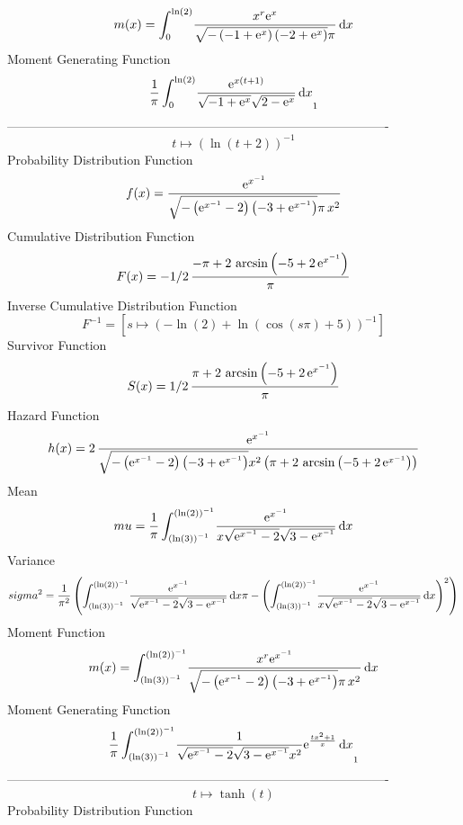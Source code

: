 \documentclass[12pt]{article}
\begin{document}
 $$ m(x) = \int_{0}^{\ln  \left( 2 \right) }\!{\frac {{x}^{r}{{\rm e}^{x}}}{
\sqrt {- \left( -1+{{\rm e}^{x}} \right)  \left( -2+{{\rm e}^{x}}
 \right) }\pi}}\,{\rm d}x
$$ Moment Generating Function 
 $${\frac {1}{\pi}\int_{0}^{\ln  \left( 2 \right) }\!{\frac {{{\rm e}^{x
 \left( t+1 \right) }}}{\sqrt {-1+{{\rm e}^{x}}}\sqrt {2-{{\rm e}^{x}}
}}}\,{\rm d}x}_{{1}}
$$-------------------------------------------------------------------------------------------  \\$$t\mapsto  \left( \ln  \left( t+2 \right)  \right) ^{-1}
$$Probability Distribution Function 
$$  f(x)={\frac {{{\rm e}^{{x}^{-1}}}}{\sqrt {- \left( {{\rm e}^{{x}^{-1}}}-2
 \right)  \left( -3+{{\rm e}^{{x}^{-1}}} \right) }\pi\,{x}^{2}}}
$$Cumulative Distribution Function  
 $$F(x)=-1/2\,{\frac {-\pi+2\,\arcsin \left( -5+2\,{{\rm e}^{{x}^{-1}}}
 \right) }{\pi}}
$$ Inverse Cumulative Distribution Function 
  $$F^{-1} = [s\mapsto  \left( -\ln  \left( 2 \right) +\ln  \left( \cos \left( s\pi
 \right) +5 \right)  \right) ^{-1}]
$$Survivor Function 
 $$ S(x)=1/2\,{\frac {\pi+2\,\arcsin \left( -5+2\,{{\rm e}^{{x}^{-1}}} \right) 
}{\pi}}
$$ Hazard Function 
 $$ h(x)=2\,{\frac {{{\rm e}^{{x}^{-1}}}}{\sqrt {- \left( {{\rm e}^{{x}^{-1}}}-
2 \right)  \left( -3+{{\rm e}^{{x}^{-1}}} \right) }{x}^{2} \left( \pi+
2\,\arcsin \left( -5+2\,{{\rm e}^{{x}^{-1}}} \right)  \right) }}
$$ Mean 
 $$ mu={\frac {1}{\pi}\int_{ \left( \ln  \left( 3 \right)  \right) ^{-1}}^{
 \left( \ln  \left( 2 \right)  \right) ^{-1}}\!{\frac {{{\rm e}^{{x}^{
-1}}}}{x\sqrt {{{\rm e}^{{x}^{-1}}}-2}\sqrt {3-{{\rm e}^{{x}^{-1}}}}}}
\,{\rm d}x}
$$ Variance 
 $$ sigma^2 = {\frac {1}{{\pi}^{2}} \left( \int_{ \left( \ln  \left( 3 \right) 
 \right) ^{-1}}^{ \left( \ln  \left( 2 \right)  \right) ^{-1}}\!{
\frac {{{\rm e}^{{x}^{-1}}}}{\sqrt {{{\rm e}^{{x}^{-1}}}-2}\sqrt {3-{
{\rm e}^{{x}^{-1}}}}}}\,{\rm d}x\pi- \left( \int_{ \left( \ln  \left( 
3 \right)  \right) ^{-1}}^{ \left( \ln  \left( 2 \right)  \right) ^{-1
}}\!{\frac {{{\rm e}^{{x}^{-1}}}}{x\sqrt {{{\rm e}^{{x}^{-1}}}-2}
\sqrt {3-{{\rm e}^{{x}^{-1}}}}}}\,{\rm d}x \right) ^{2} \right) }
$$ Moment Function 
 $$ m(x) = \int_{ \left( \ln  \left( 3 \right)  \right) ^{-1}}^{ \left( \ln 
 \left( 2 \right)  \right) ^{-1}}\!{\frac {{x}^{r}{{\rm e}^{{x}^{-1}}}
}{\sqrt {- \left( {{\rm e}^{{x}^{-1}}}-2 \right)  \left( -3+{{\rm e}^{
{x}^{-1}}} \right) }\pi\,{x}^{2}}}\,{\rm d}x
$$ Moment Generating Function 
 $${\frac {1}{\pi}\int_{ \left( \ln  \left( 3 \right)  \right) ^{-1}}^{
 \left( \ln  \left( 2 \right)  \right) ^{-1}}\!{\frac {1}{\sqrt {{
{\rm e}^{{x}^{-1}}}-2}\sqrt {3-{{\rm e}^{{x}^{-1}}}}{x}^{2}}{{\rm e}^{
{\frac {t{x}^{2}+1}{x}}}}}\,{\rm d}x}_{{1}}
$$-------------------------------------------------------------------------------------------  \\$$t\mapsto \tanh \left( t \right) 
$$Probability Distribution Function 
\end{document}
